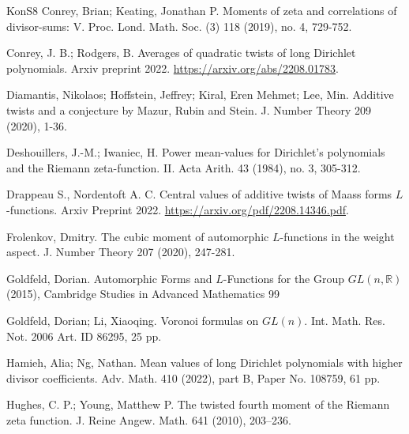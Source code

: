 \documentclass[11pt,reqno]{amsart}
\theoremstyle{definition}
\theoremstyle{definition}
\theoremstyle{remark}
\newcommand{\R}{\ensuremath{\mathbb{R}}}
\numberwithin{equation}{section}
\begin{document}
\begin{thebibliography}{KonS8}
	   Conrey, Brian; Keating, Jonathan P. Moments of zeta and correlations of divisor-sums: V. Proc. Lond. Math. Soc. (3) 118 (2019), no. 4, 729-752. 
	   
	   Conrey, J. B.; Rodgers, B. Averages of quadratic twists of long Dirichlet polynomials. Arxiv preprint 2022. \url{https://arxiv.org/abs/2208.01783}. 
	   
	    
	 

	 

	Diamantis, Nikolaos; Hoffstein, Jeffrey; Kiral, Eren Mehmet; Lee, Min.  Additive twists and a conjecture by Mazur, Rubin and Stein. J. Number Theory 209 (2020), 1-36.
	 
	 
	 
	 Deshouillers, J.-M.; Iwaniec, H. Power mean-values for Dirichlet's polynomials and the Riemann zeta-function. II. Acta Arith. 43 (1984), no. 3, 305-312.
	 
	 Drappeau S.,  Nordentoft A. C. Central values of additive twists of Maass forms $L$-functions. Arxiv Preprint 2022. \url{https://arxiv.org/pdf/2208.14346.pdf}.

	 Frolenkov, Dmitry.  The cubic moment of automorphic $L$-functions in the weight aspect. J. Number Theory 207 (2020), 247-281.
	

	
	Goldfeld, Dorian.  Automorphic Forms and $L$-Functions for the Group $GL(n,\R)$ (2015), Cambridge Studies in Advanced Mathematics 99
	
	 Goldfeld, Dorian; Li, Xiaoqing. Voronoi formulas on $GL(n)$. Int. Math. Res. Not. 2006  Art. ID 86295, 25 pp.
	
	
 
 
 Hamieh, Alia; Ng, Nathan. Mean values of long Dirichlet polynomials with higher divisor coefficients. Adv. Math. 410 (2022), part B, Paper No. 108759, 61 pp.
 
 Hughes, C. P.; Young, Matthew P. The twisted fourth moment of the Riemann zeta function. J. Reine Angew. Math. 641 (2010), 203–236.



\end{thebibliography}
\end{document}
